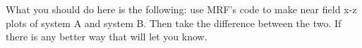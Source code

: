 What you should do here is the following: use MRF's code to make near field
x-z plots of system A and system B.  Then take the difference between the
two.  If there is any better way that will let you know.
